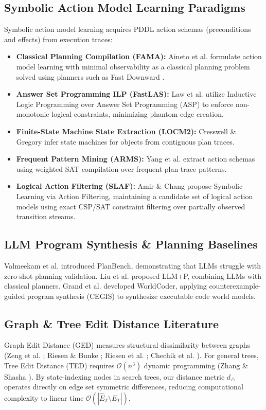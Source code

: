 \documentclass[preprint,12pt,3p]{elsarticle}
\begin{document}
\subsection{Symbolic Action Model Learning Paradigms}
Symbolic action model learning acquires PDDL action schemas (preconditions and effects) from execution traces:
\begin{itemize}
    \item \textbf{Classical Planning Compilation (FAMA):} Aineto et al. \cite{Aineto2019AIJ} formulate action model learning with minimal observability as a classical planning problem solved using planners such as Fast Downward \cite{Helmert2006JAIR}.
    \item \textbf{Answer Set Programming ILP (FastLAS):} Law et al. \cite{Law2020AAAI} utilize Inductive Logic Programming over Answer Set Programming (ASP) to enforce non-monotonic logical constraints, minimizing phantom edge creation.
    \item \textbf{Finite-State Machine State Extraction (LOCM2):} Cresswell \& Gregory \cite{Cresswell2011ICAPS} infer state machines for objects from contiguous plan traces.
    \item \textbf{Frequent Pattern Mining (ARMS):} Yang et al. \cite{Yang2007IJCAI} extract action schemas using weighted SAT compilation over frequent plan trace patterns.
    \item \textbf{Logical Action Filtering (SLAF):} Amir \& Chang \cite{Amir2008AAAI, Amir2008JAIR} propose Symbolic Learning via Action Filtering, maintaining a candidate set of logical action models using exact CSP/SAT constraint filtering over partially observed transition streams.
\end{itemize}

\subsection{LLM Program Synthesis \& Planning Baselines}
Valmeekam et al. \cite{Valmeekam2023NeurIPS} introduced PlanBench, demonstrating that LLMs struggle with zero-shot planning validation. Liu et al. \cite{Liu2023LLMP} proposed LLM+P, combining LLMs with classical planners. Grand et al. \cite{Grand2025ICML} developed WorldCoder, applying counterexample-guided program synthesis (CEGIS) to synthesize executable code world models.

\subsection{Graph \& Tree Edit Distance Literature}
Graph Edit Distance (GED) measures structural dissimilarity between graphs (Zeng et al. \cite{Zeng2009VLDB}; Riesen \& Bunke \cite{Riesen2009PR}; Riesen et al. \cite{Riesen2014PRL}; Chechik et al. \cite{Chechik2008DSO}). For general trees, Tree Edit Distance (TED) requires $\mathcal{O}(n^3)$ dynamic programming (Zhang \& Shasha \cite{Zhang1989Algorithmica}). By state-indexing nodes in search trees, our distance metric $d_\triangle$ operates directly on edge set symmetric differences, reducing computational complexity to linear time $\mathcal{O}(|\hat{E}_T \setminus E_T|)$.
\end{document}
